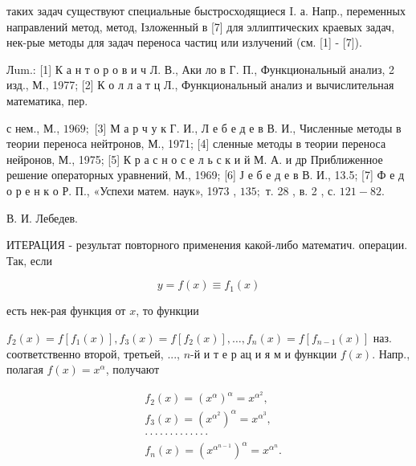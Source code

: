 \documentclass[10pt]{article}
\begin{document}
таких задач существуют специальные быстросходящиеся I. а. Напр., переменных направлений метод, метод, Ізложенный в [7] для эллиптических краевых задач, нек-рые методы для задач переноса частиц или излучений (см. [1] - [7]).



Лum.: [1] К а н т о р о в и ч Л. В., Аки ло в Г. П., Функциональный анализ, 2 изд., М., 1977; [2] К о л л а т ц Л., Функциональный анализ и вычислительная математика, пер.

с нем., М., $1969 ;$ [3] М а р ч у к Г. И., Л е б е д е в В. И., Численные методы в теории переноса нейтронов, М., 1971; [4] сленные методы в теории переноса нейронов, М., 1975; [5] К р а с н о с е л ь с к и й М. А. и др Приближенное решение операторных уравнений, М., 1969; [6] Ј е б е д е в В. И., 13.5; [7] Ф е д о р е н к о Р. П., «Успехи матем. наук», 1973 , $135 ;$ т. 28 , в. 2 , с. $121-82$.



В. И. Лебедев.



ИТЕРАЦИЯ - результат повторного применения какой-либо математич. операции. Так, если



\[

y=f(x) \equiv f_{1}(x)

\]



есть нек-рая функция от $x$, то функции



$f_{2}(x)=f\left[f_{1}(x)\right], f_{3}(x)=f\left[f_{2}(x)\right], \ldots, f_{n}(x)=f\left[f_{n-1}(x)\right]$ наз. соответственно второй, третьей, ..., $n$-й и т е р ац и я м и функции $f(x)$. Напр., полагая $f(x)=x^{\alpha}$, получают



\[

\begin{aligned}

& f_{2}(x)=\left(x^{\alpha}\right)^{\alpha}=x^{\alpha^{2}}, \\

& f_{3}(x)=\left(x^{\alpha^{2}}\right)^{\alpha}=x^{\alpha^{3}}, \\

& \cdot \cdot \cdot \cdot \cdot \cdot \cdot \cdot \cdot \cdot \cdot \cdot \cdot \\

& f_{n}(x)=\left(x^{\alpha^{n-1}}\right)^{\alpha}=x^{\alpha^{n}} .

\end{aligned}

\]
\end{document}
